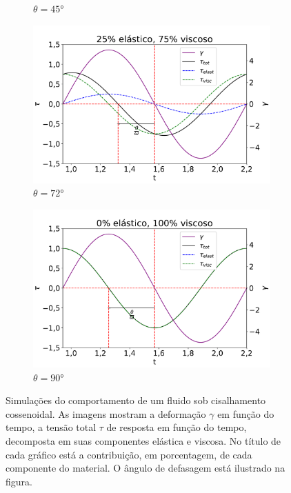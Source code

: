 \begin{figure}[H]
\begin{subfigure}[t]{0.3\textwidth}
					\caption{\(\theta=45°\)}
					\label{fig:osc_sim50}
				\end{subfigure}
			
				\hspace{2.5cm} \begin{subfigure}[t]{0.3\textwidth}
					\centering
					\includegraphics[width=\textwidth]{./imagens/reologia/Simulacao_visc_75}
					\caption{\(\theta=72°\)}
					\label{fig:osc_sim75}
				\end{subfigure}%
				\begin{subfigure}[t]{0.3\textwidth}
					\centering
					\includegraphics[width=\textwidth]{./imagens/reologia/Simulacao_visc_100}
					\caption{\(\theta=90°\)}
					\label{fig:osc_sim100}
				\end{subfigure}%
			\caption{Simulações do comportamento de um fluido sob cisalhamento cossenoidal. As imagens mostram a deformação \(\gamma\) em função do tempo, a tensão total \(\tau\) de resposta em função do tempo, decomposta em suas componentes elástica e viscosa. No título de cada gráfico está a contribuição, em porcentagem, de cada componente do material. O ângulo de defasagem está ilustrado na figura.}
			\label{fig:osc_simulacoes}
			\end{figure}  %
			
